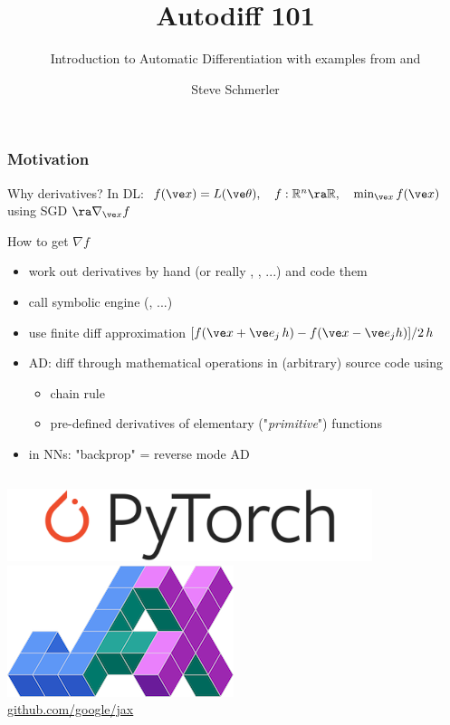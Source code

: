 \documentclass[fleqn,10pt]{beamer}
\title{Autodiff 101}
\subtitle{Introduction to Automatic Differentiation with examples from \jax and \pytorch}
\author{Steve Schmerler}
\institute{FWCC/Helmholtz AI}
\date{}
\begin{document}
\begin{frame}
    \titlepage
\end{frame}

\begin{frame}
    \frametitle{Motivation}
    \begin{block}{Why derivatives?}
        In DL: $f(\ve x) = L(\ve\theta),\quad f:\mathbb R^n\ra\mathbb R,\quad \min_{\ve x}f(\ve x)$ using SGD $\ra\nabla_{\ve x} f$
    \end{block}
    \begin{block}{How to get $\nabla f$}
    \begin{itemize}
        \item work out derivatives by hand (or really , \sympy, ...) and code them
        \item call symbolic engine (, ...)
        \item use finite diff approximation $[f(\ve x +\ve e_j\,h) - f(\ve x-\ve e_j h)]/2\,h$
        \item AD: diff through mathematical operations in (arbitrary) source code using
        \begin{itemize}
            \item chain rule
            \item pre-defined derivatives of elementary ("\emph{primitive}") functions
        \end{itemize}
        \item in NNs: "backprop" = reverse mode AD
    \end{itemize}
    \end{block}
    \begin{columns}
            \centering
            \includegraphics[width=0.8\textwidth]{pics/pytorch-logo-dark.png}
            \centering
            \includegraphics{pics/jax_logo_250px.png}\\
            \url{github.com/google/jax}
    \end{columns}
\end{frame}
\end{document}
